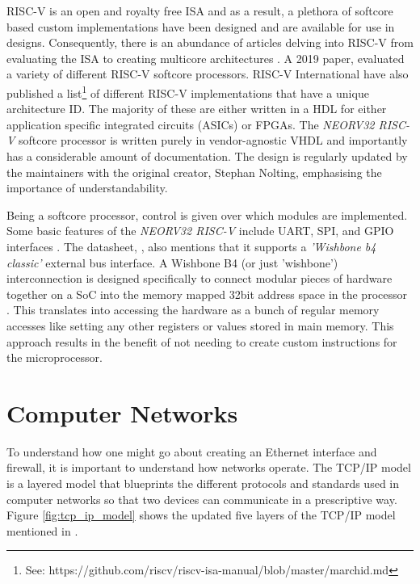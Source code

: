 RISC-V is an open and royalty free ISA and as a result, a plethora of softcore based custom implementations have been designed and are available for use in designs\cite{CatalogRISCSoftcore}. 
Consequently, there is an abundance of articles delving into RISC-V from evaluating the ISA \cite{InvestigatingRiscv} to creating multicore architectures
\cite{RiscVMulticore}. A 2019 paper, \cite{CatalogRISCSoftcore} evaluated a variety of different RISC-V softcore processors. RISC-V International have 
also published a list\footnote[1]{See: https://github.com/riscv/riscv-isa-manual/blob/master/marchid.md} of different RISC-V implementations 
that have a unique architecture ID. The majority of these are either written in a HDL for either application specific integrated circuits (ASICs) or FPGAs.
The \textit{NEORV32 RISC-V} softcore processor is written purely in vendor-agnostic VHDL and importantly has a considerable amount of documentation. The design is regularly updated by the maintainers with the original creator, Stephan Nolting, emphasising the importance of understandability. 

Being a softcore processor, control is given over which modules are implemented. Some basic features of the \textit{NEORV32 RISC-V} include 
UART, SPI, and GPIO interfaces \cite{neorv32Datasheet}. The datasheet, \cite{neorv32Datasheet}, also mentions that it supports a \textit{'Wishbone b4 classic'} 
external bus interface. A Wishbone B4 (or just 'wishbone') interconnection is designed specifically to connect modular pieces of hardware together on a 
SoC into the memory mapped 32bit address space in the processor \cite{WishboneSpec}. This translates into accessing the hardware as a bunch of regular memory accesses like setting any other registers or values stored in main memory. This approach results in the benefit of not needing to create custom 
instructions for the microprocessor. 







\section{Computer Networks}
\label{sec:computer_networks}
To understand how one might go about creating an Ethernet interface and firewall, it is important to understand how networks operate. The TCP/IP model is a layered model that blueprints the different protocols and standards used in computer networks so that two devices can communicate in a prescriptive way. 
Figure \ref{fig:tcp_ip_model} shows the updated five layers of the TCP/IP model mentioned in \cite{ciscoCCNABook}.


